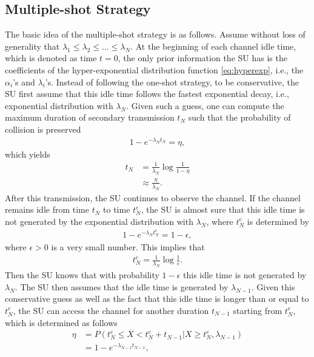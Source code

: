 \documentclass[10pt,final,journal,letterpaper]{IEEEtran}
\begin{document}
\subsection{Multiple-shot Strategy}
The basic idea of the multiple-shot strategy is as follows. Assume without loss of generality that $\lambda_1\leq\lambda_2\leq\ldots\leq\lambda_N$. At the beginning of each channel idle time, which is denoted as time $t=0$, the only prior information the SU has is the coefficients of the hyper-exponential distribution function \eqref{eq:hyperexp}, i.e., the $\alpha_i$'s and $\lambda_i$'s. Instead of following the one-shot strategy, to be conservative, the SU first assume that this idle time follows the fastest exponential decay, i.e., exponential distribution with $\lambda_N$. Given such a guess, one can compute the maximum duration of secondary transmission $t_N$ such that the probability of collision is preserved
\begin{align}
    1-e^{-\lambda_Nt_N}=\eta,\nonumber
\end{align}
which yields
\begin{align}
    t_N&=\frac{1}{\lambda_N}\log\frac{1}{1-\eta}\nonumber\\
    &\approx\frac{\eta}{\lambda_N}.\nonumber
\end{align}
After this transmission, the SU continues to observe the channel. If the channel remains idle from time $t_N$ to time $t_N^e$, the SU is almost sure that this idle time is not generated by the exponential distribution with $\lambda_N$, where $t_N^e$ is determined by
\begin{align}
    1-e^{-\lambda_Nt_N^e}=1-\epsilon,\nonumber
\end{align}
where $\epsilon>0$ is a very small number. This implies that
\begin{align}
    t_N^e=\frac{1}{\lambda_N}\log\frac{1}{\epsilon}.\nonumber
\end{align}
Then the SU knows that with probability $1-\epsilon$ this idle time is not generated by $\lambda_N$. The SU then assumes that the idle time is generated by $\lambda_{N-1}$. Given this conservative guess as well as the fact that this idle time is longer than or equal to $t_N^e$, the SU can access the channel for another duration $t_{N-1}$ starting from $t_N^e$, which is determined as follows
\begin{align}
    \eta&=P(t_N^e\leq X< t_N^e+t_{N-1}|X\geq t_N^e, \lambda_{N-1})\nonumber \\
    &=1-e^{-\lambda_{N-1}t_{N-1}},\nonumber
\end{align}
\end{document}
